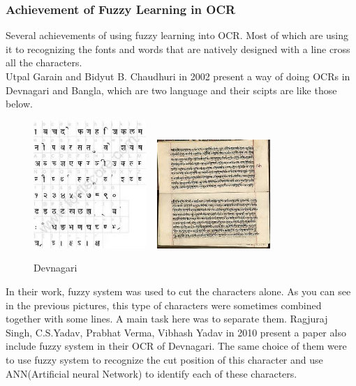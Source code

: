 \documentclass[12pt]{article} %
\begin{document}
\subsubsection{Achievement of Fuzzy Learning in OCR}
Several achievements of using fuzzy learning into OCR. Most of which are using it to recognizing the fonts and words that are natively designed with a line cross all the characters. \\
Utpal Garain and Bidyut B. Chaudhuri in 2002 present a way of doing OCRs in Devnagari and Bangla, which are two language and their scipts are like those below.
\begin{figure}[!htb]
    \begin{center}
        \includegraphics[width=0.38\textwidth]{devnagari}
        \mbox{    }
        \includegraphics[width=0.38\textwidth]{devnagariPrinted}
    \end{center}
    \caption{Devnagari}
    \label{Devenagari}
\end{figure}
In their work, fuzzy system was used to cut the characters alone. As you can see in the previous pictures, this type of characters were sometimes combined together with some lines. A main task here was to separate them.
Ragjuraj Singh, C.S.Yadav, Prabhat Verma, Vibhash Yadav in 2010 present a paper also include fuzzy system in their OCR of Devnagari. The same choice of them were to use fuzzy system to recognize the cut position of this character and use ANN(Artificial neural Network) to identify each of these characters.
\end{document}
